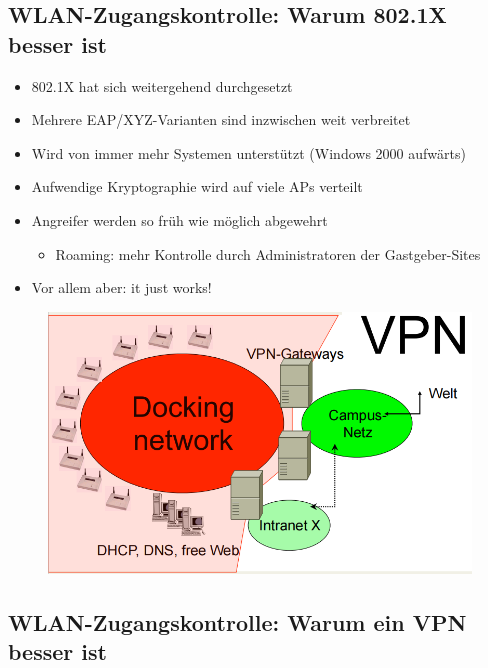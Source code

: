 \documentclass[openany]{book}
\begin{document}
\subsection{WLAN-Zugangskontrolle: Warum 802.1X besser ist}

\begin{itemize}
    \item 802.1X hat sich weitergehend durchgesetzt
    \item Mehrere EAP/XYZ-Varianten sind inzwischen weit verbreitet
    \item Wird von immer mehr Systemen unterstützt (Windows 2000 aufwärts)
    \item Aufwendige Kryptographie wird auf viele APs verteilt
    \item Angreifer werden so früh wie möglich abgewehrt
    \begin{itemize}
        \item Roaming: mehr Kontrolle durch Administratoren der Gastgeber-Sites
    \end{itemize}
    \item Vor allem aber: it just works!
\end{itemize}

\begin{figure}[h!]
    \centering
    \includegraphics[width=0.85\linewidth]{Pics/VPN.PNG}
\end{figure}

\subsection{WLAN-Zugangskontrolle: Warum ein VPN besser ist}
\end{document}
